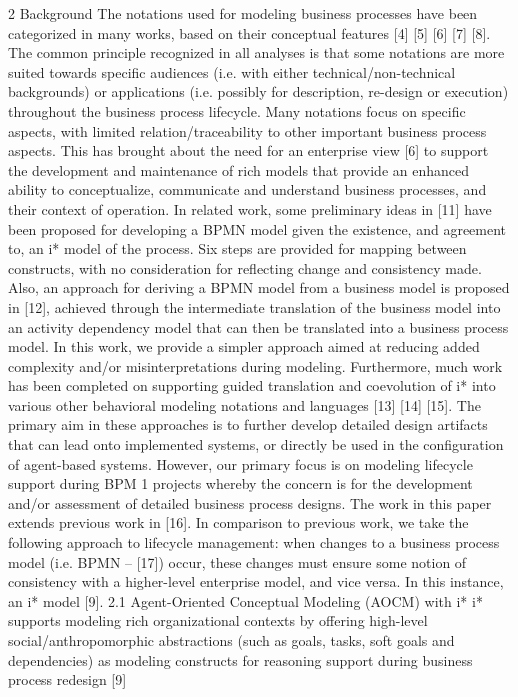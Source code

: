 2 Background
The notations used for modeling business processes have been categorized in many
works, based on their conceptual features [4] [5] [6] [7] [8]. The common principle
recognized in all analyses is that some notations are more suited towards specific
audiences (i.e. with either technical/non-technical backgrounds) or applications (i.e.
possibly for description, re-design or execution) throughout the business process
lifecycle. Many notations focus on specific aspects, with limited relation/traceability
to other important business process aspects. This has brought about the need for an
enterprise view [6] to support the development and maintenance of rich models that
provide an enhanced ability to conceptualize, communicate and understand business
processes, and their context of operation.
In related work, some preliminary ideas in [11] have been proposed for developing
a BPMN model given the existence, and agreement to, an i* model of the process.
Six steps are provided for mapping between constructs, with no consideration for
reflecting change and consistency made. Also, an approach for deriving a BPMN
model from a business model is proposed in [12], achieved through the intermediate
translation of the business model into an activity dependency model that can then be
translated into a business process model. In this work, we provide a simpler approach
aimed at reducing added complexity and/or misinterpretations during modeling. Furthermore, much work has been completed on supporting guided translation and coevolution of i* into various other behavioral modeling notations and languages [13]
[14] [15]. The primary aim in these approaches is to further develop detailed design
artifacts that can lead onto implemented systems, or directly be used in the configuration of agent-based systems. However, our primary focus is on modeling lifecycle
support during BPM
1
projects whereby the concern is for the development and/or
assessment of detailed business process designs. The work in this paper extends
previous work in [16]. In comparison to previous work, we take the following approach to lifecycle management: when changes to a business process model (i.e.
BPMN – [17]) occur, these changes must ensure some notion of consistency with a
higher-level enterprise model, and vice versa. In this instance, an i* model [9].
2.1 Agent-Oriented Conceptual Modeling (AOCM) with i*
i* supports modeling rich organizational contexts by offering high-level social/anthropomorphic abstractions (such as goals, tasks, soft goals and dependencies)
as modeling constructs for reasoning support during business process redesign [9]
